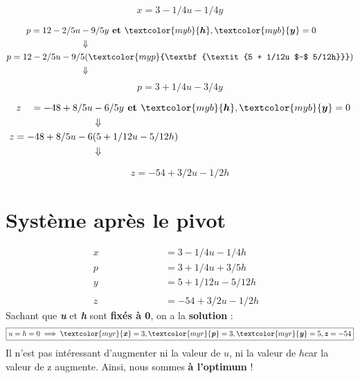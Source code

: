 \documentclass{report}
\begin{document}
\begin{multicols*}{2}
\vspace{-1em}
      \[%
          \boxed{x = 3 -1/4u -1/4y}
      \]%

\begin{align*}
    p = 12 - 2/5u &-9/5y 
    \textbf{ et } \textcolor{myb}{\boldsymbol{h}}, \textcolor{myb}{\boldsymbol{y}}  = 0 
    \\
      &\Downarrow
    \\ 
    p = 12 - 2/5u -9/&5(\textcolor{myp}{\textbf{\textit{5 + 1/12u $-$ 5/12h}}}) 
    \\
                    &\Downarrow
\end{align*}
\vspace{-1em}
      \[%
          \boxed{p = 3 + 1/4u -3/4y}
      \]%


\begin{align*}
    z \quad = -48 +8/5u &- 6/5y
    \textbf{ et } \textcolor{myb}{\boldsymbol{h}}, \textcolor{myb}{\boldsymbol{y}}  = 0 
    \\
                      &\Downarrow \\
    z = -48 +8/5u -6&(5 +1/12u -5/12h)
    \\
                    &\Downarrow
\end{align*}

\vspace{-1.25em}
      \[%
    \boxed{z = -54 +3/2u -1/2h}
      \]%

\section{Système après le pivot}
\begin{align*}
    x \quad\quad\quad\quad\quad\quad &= 3 - 1/4u -1/4h& \\
    p \quad\quad\quad\quad  &= 3 +1/4u +3/5h& \\
    y \quad\quad &= 5 + 1/12u -5/12h&
    \\\\
    z\quad &= -54 +3/2u -1/2h
\end{align*}
Sachant que 
\textcolor{myb}{\textbf{\textit{u}}} et 
\textcolor{myb}{\textbf{\textit{h}}}  sont \textbf{fixés à 0}, 
on a la \textbf{solution} : 
\begin{align*}
\boxed{u = h = 0 \implies 
\textcolor{myr}{\textbf{\textit{x}}}  = 3, 
\textcolor{myr}{\textbf{\textit{p}}} = 3,
\textcolor{myr}{\textbf{\textit{y}}} = 5,
\textbf{\textit{z}} = -54}
\end{align*}
Il n’est pas intéressant d’augmenter ni la valeur de $u$, ni la valeur de $h$car la valeur 
de z augmente. Ainsi, nous sommes \textbf{à l’optimum} !

\end{multicols*}
\end{document}
